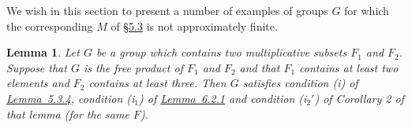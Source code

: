 \documentclass[b5paper,twoside]{article}
\newcommand{\secref}[2]{\hyperref[#1]{\mbox{\S#2}}}
\newcommand{\lemref}[2]{\hyperref[#1]{\mbox{Lemma~#2}}}
\theoremstyle{mvnplain}
\newtheorem{lemma}{Lemma}[section]
\newcommand{\M}{\mathbf M}
\def\M{M}%
\def\mathfrak#1{#1}%
\begin{document}
We wish in this section to present a number of examples of groups $\mathfrak G$
for which the corresponding $\M$ of \secref{sec:5.3}{5.3} is not
approximately finite.

\begin{lemma}\label{lem:6.3.1}
Let $\mathfrak G$ be a group which contains two multiplicative subsets
$\mathfrak F_1$ and $\mathfrak F_2$. Suppose that $\mathfrak G$ is the free
product of $\mathfrak F_1$ and $\mathfrak F_2$ and that $\mathfrak F_1$
contains at least two elements and $\mathfrak F_2$ contains at least three.
Then $\mathfrak G$ satisfies condition (i) of \lemref{lem:5.3.4}{5.3.4},
condition (i$_1$) of \lemref{lem:6.2.1}{6.2.1} and condition (i$_2'$) of
Corollary 2 of that lemma (for the same $\mathfrak F$).
\end{lemma}
\end{document}
